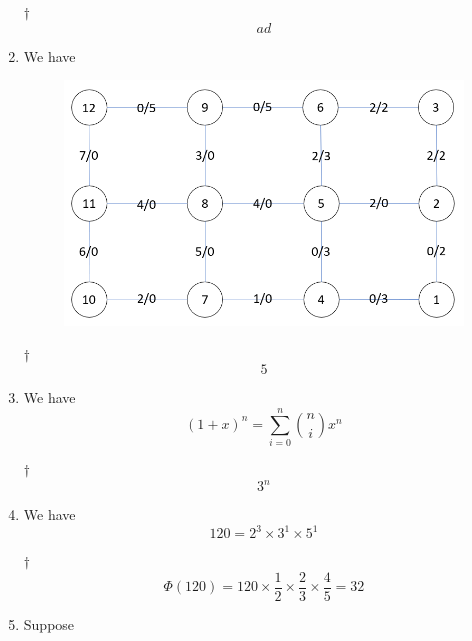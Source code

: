\documentclass[a4paper,12pt]{article}
\begin{document}
\begin{enumerate}
\begin{enumerate}[label=(\alph*)]
\begin{equation}
		\end{equation}
	\end{enumerate}
	\begin{answer}{$\dag$}\begin{equation}
			ad
		\end{equation}
	\end{answer}
	\item We have \quad\begin{figure}[H]
		\centering
		\includegraphics[scale=0.6]{img/ntu_104_math_2.png}
		\label{img:ntu_104_math_2}
	\end{figure}
	\begin{answer}{$\dag$}\begin{equation}
			5	
		\end{equation}
	\end{answer}
	\item We have \begin{equation}
		(1 + x)^n = \sum_{i = 0}^{n}\binom{n}{i}x^n
	\end{equation}
	\begin{answer}{$\dag$}\begin{equation}
			3^n
		\end{equation}
	\end{answer}
	\item We have \begin{equation}
		120 = 2^3 \times 3^1 \times 5^1
	\end{equation}
	\begin{answer}{$\dag$}\begin{equation}
			\Phi(120) = 120 \times \frac{1}{2} \times \frac{2}{3} \times \frac{4}{5} = 32
		\end{equation}
	\end{answer}
	\item Suppose \begin{equation}

\end{equation}
\end{enumerate}
\end{document}
